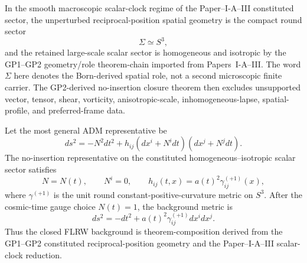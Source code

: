\documentclass[12pt,a4paper]{article}
\begin{document}
\begin{theorem}
\label{p8:thm:gp2-closed-flrw-background}
In the smooth macroscopic scalar-clock regime of the Paper--I-A--III constituted sector, the unperturbed reciprocal-position spatial geometry is the compact round sector
\[
\Sigma\simeq S^3,
\]
and the retained large-scale scalar sector is homogeneous and isotropic by the GP1--GP2 geometry/role theorem-chain imported from Papers~I-A--III.  The word \(\Sigma\) here denotes the Born-derived spatial role, not a second microscopic finite carrier.  The GP2-derived no-insertion closure theorem then excludes unsupported vector, tensor, shear, vorticity, anisotropic-scale, inhomogeneous-lapse, spatial-profile, and preferred-frame data.

Let the most general ADM representative be
\[
ds^2=-N^2dt^2+h_{ij}(dx^i+N^i dt)(dx^j+N^jdt).
\]
The no-insertion representative on the constituted homogeneous--isotropic scalar sector satisfies
\[
N=N(t),\qquad N^i=0,\qquad h_{ij}(t,x)=a(t)^2\gamma^{(+1)}_{ij}(x),
\]
where \(\gamma^{(+1)}\) is the unit round constant-positive-curvature metric on \(S^3\).  After the cosmic-time gauge choice \(N(t)=1\), the background metric is
\[
ds^2=-dt^2+a(t)^2\gamma^{(+1)}_{ij}dx^idx^j.
\]
Thus the closed FLRW background is theorem-composition derived from the GP1--GP2 constituted reciprocal-position geometry and the Paper--I-A--III scalar-clock reduction.
\end{theorem}
\end{document}
